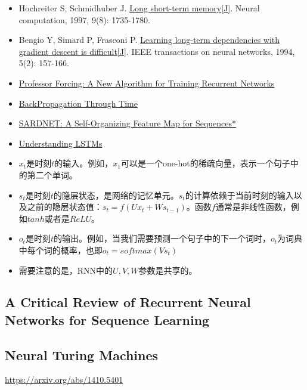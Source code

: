 
\begin{itemize}
\item Hochreiter S, Schmidhuber J. \href{http://web.eecs.utk.edu/~itamar/courses/ECE-692/Bobby_paper1.pdf}{Long short-term memory[J]}. Neural computation, 1997, 9(8): 1735-1780.
\item Bengio Y, Simard P, Frasconi P. \href{http://www-dsi.ing.unifi.it/~paolo/ps/tnn-94-gradient.pdf}{Learning long-term dependencies with gradient descent is difficult[J]}. IEEE transactions on neural networks, 1994, 5(2): 157-166.
\item \href{https://arxiv.org/pdf/1610.09038.pdf}{Professor Forcing: A New Algorithm for Training Recurrent Networks}
\item \href{http://ir.hit.edu.cn/~jguo/docs/notes/bptt.pdf}{BackPropagation Through Time}
\item \href{http://nn.cs.utexas.edu/downloads/papers/james.sardnet.pdf}{SARDNET: A Self-Organizing Feature Map for Sequences*}
\item \href{http://colah.github.io/posts/2015-08-Understanding-LSTMs/}{Understanding LSTMs}
\end{itemize}

\begin{itemize}
\item $x_t$是时刻$t$的输入。例如，$x_1$可以是一个one-hot的稀疏向量，表示一个句子中的第二个单词。
\item $s_t$是时刻$t$的隐层状态，是网络的记忆单元。$s_t$的计算依赖于当前时刻的输入以及之前的隐层状态值：$s_t=f(Ux_t+Ws_{t-1})$。函数$f$通常是非线性函数，例如$tanh$或者是$ReLU$。
\item $o_t$是时刻$t$的输出。例如，当我们需要预测一个句子中的下一个词时，$o_t$为词典中每个词的概率，也即$o_t=softmax(Vs_t)$
\item 需要注意的是，RNN中的$U,V,W$参数是共享的。
\end{itemize}

\subsection{A Critical Review of Recurrent Neural Networks for Sequence Learning}

\subsection{Neural Turing Machines}
\href{Neural Turing Machines}{https://arxiv.org/abs/1410.5401}

